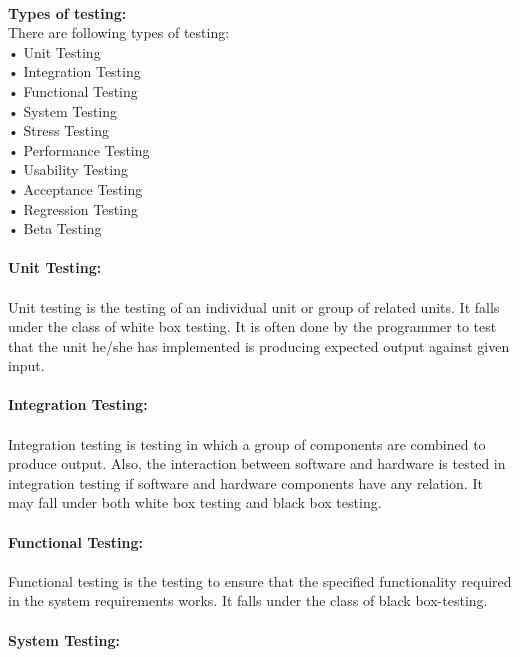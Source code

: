 \documentclass[11pt,a4paper]{report}
\begin{document}
\textbf{\\Types of testing:\\}
There are following types of testing:\\

•	Unit Testing\\

•	 Integration Testing\\

•	 Functional Testing\\

•	 System Testing\\

•	 Stress Testing\\

•	 Performance Testing\\

•	 Usability Testing\\

•	 Acceptance Testing\\

•	 Regression Testing\\

•	 Beta Testing\\

\textbf{\\Unit Testing:\\}
\paragraph{}Unit testing is the testing of an individual unit or group of related units. It falls under the class of white box testing. It is often done by the programmer to test that the unit he/she has implemented is producing expected output against given input.\\
\textbf{\\Integration Testing:\\}
\paragraph{}Integration testing is testing in which a group of components are combined to produce output. Also, the interaction between software and hardware is tested in integration testing if software and hardware components have any relation. It may fall under both white box testing and black box testing.\\
\textbf{\\Functional Testing:\\}
\paragraph{}Functional testing is the testing to ensure that the specified functionality required in the system requirements works. It falls under the class of black box-testing.\\
\textbf{\\System Testing:\\}
\end{document}
